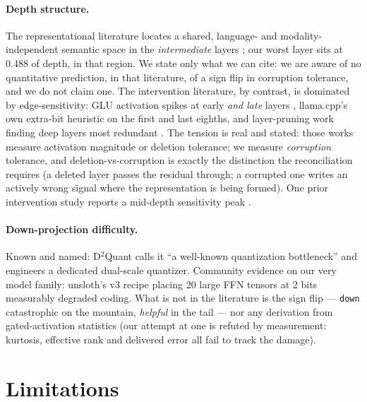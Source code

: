 \documentclass[10pt]{article} %
\begin{document}
\paragraph{Depth structure.} The representational literature locates a shared,
language- and modality-independent semantic space in the \emph{intermediate}
layers \citep{wu2025semantichub}; our worst layer sits at 0.488 of depth, in
that region. We state only what we can cite: we are aware of no quantitative
prediction, in that literature, of a sign flip in corruption tolerance, and we
do not claim one. The
intervention literature, by contrast, is dominated by edge-sensitivity: GLU
activation spikes at early \emph{and late} layers \citep{yang2024gluspikes},
llama.cpp's own extra-bit heuristic on the first and last eighths, and layer-pruning work
finding deep layers most redundant \citep{shortgpt,gromov2024unreasonable}. The tension is real and stated: those
works measure activation magnitude or deletion tolerance; we measure
\emph{corruption} tolerance, and deletion-vs-corruption is exactly the distinction
the reconciliation requires (a deleted layer passes the residual through; a
corrupted one writes an actively wrong signal where the representation is
being formed). One prior intervention study reports a mid-depth sensitivity
peak \citep[activation injection, mean peak 54.9\%]{xu2025steering}.

\paragraph{Down-projection difficulty.} Known and named: D$^2$Quant \citep{yan2026d2quant}
calls it ``a well-known quantization bottleneck'' and engineers a dedicated
dual-scale quantizer. Community evidence on our very model family: unsloth's
v3 recipe placing 20 large FFN tensors at 2 bits measurably degraded coding.
What is not in the literature is the sign flip --- \texttt{down} catastrophic on the
mountain, \emph{helpful} in the tail --- nor any derivation from gated-activation
statistics (our attempt at one is refuted by measurement: kurtosis, effective
rank and delivered error all fail to track the damage).

\section{Limitations}
\label{sec:limitations}
\end{document}
